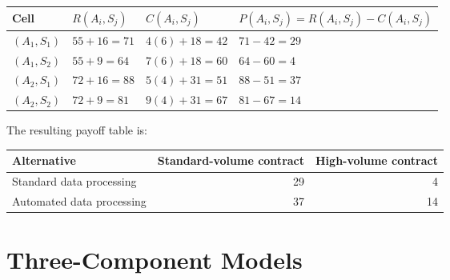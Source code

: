 \begin{center}
	\small
	\begin{tabular}{llll}
		\toprule
		Cell
		& \(R(A_i,S_j)\)
		& \(C(A_i,S_j)\)
		& \(P(A_i,S_j)=R(A_i,S_j)-C(A_i,S_j)\) \\
		\midrule
		\((A_1,S_1)\)
		& \(55+16=71\)
		& \(4(6)+18=42\)
		& \(71-42=29\) \\
		
		\((A_1,S_2)\)
		& \(55+9=64\)
		& \(7(6)+18=60\)
		& \(64-60=4\) \\
		
		\((A_2,S_1)\)
		& \(72+16=88\)
		& \(5(4)+31=51\)
		& \(88-51=37\) \\
		
		\((A_2,S_2)\)
		& \(72+9=81\)
		& \(9(4)+31=67\)
		& \(81-67=14\) \\
		\bottomrule
	\end{tabular}
\end{center}

The resulting payoff table is:

\begin{center}
	\begin{tabular}{lrr}
		\toprule
		Alternative & Standard-volume contract & High-volume contract \\
		\midrule
		Standard data processing & 29 & 4 \\
		Automated data processing & 37 & 14 \\
		\bottomrule
	\end{tabular}
\end{center}


\section{Three-Component Models}
\label{sec:three-component-models}


